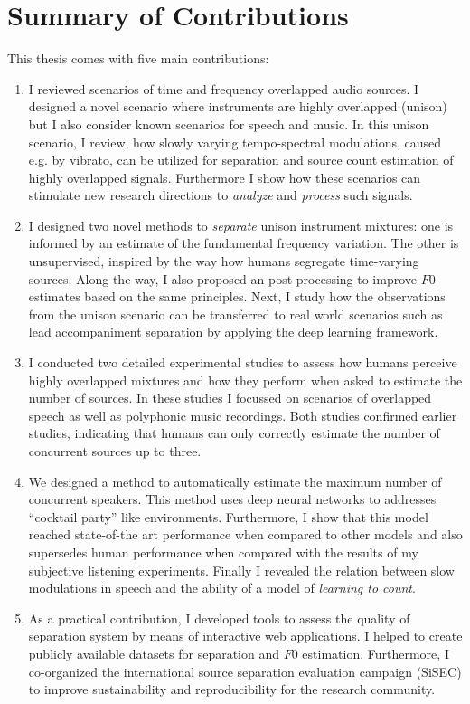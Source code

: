\section{Summary of Contributions}

This thesis comes with five main contributions:

\begin{enumerate}
\item I reviewed scenarios of time and frequency overlapped audio sources.
I designed a novel scenario where instruments are highly overlapped (unison) but I also consider known scenarios for speech and music.
In this unison scenario, I review, how slowly varying tempo-spectral modulations, caused e.g. by vibrato, can be utilized for separation and source count estimation of highly overlapped signals.
Furthermore I show how these scenarios can stimulate new research directions to \emph{analyze} and \emph{process} such signals.

\item I designed two novel methods to \emph{separate} unison instrument mixtures: one is informed by an estimate of the fundamental frequency variation.
The other is unsupervised, inspired by the way how humans segregate time-varying sources.
Along the way, I also proposed an post-processing to improve \(F0\) estimates based on the same principles.
Next, I study how the observations from the unison scenario can be transferred to real world scenarios such as lead accompaniment separation by applying the deep learning framework.

\item I conducted two detailed experimental studies to assess how humans perceive highly overlapped mixtures and how they perform when asked to estimate the number of sources.
In these studies I focussed on scenarios of overlapped speech as well as polyphonic music recordings.
Both studies confirmed earlier studies, indicating that humans can only correctly estimate the number of concurrent sources up to three.

\item We designed a method to automatically estimate the maximum number of concurrent speakers. This method uses deep neural networks to addresses ``cocktail party'' like environments.
Furthermore, I show that this model reached state-of-the art performance when compared to other models and also supersedes human performance when compared with the results of my subjective listening experiments.
Finally I revealed the relation between slow modulations in speech and the ability of a model of \emph{learning to count}.

\item As a practical contribution, I developed tools to assess the quality of separation system by means of interactive web applications. 
I helped to create publicly available datasets for separation and \(F0\) estimation.
Furthermore, I  co-organized the international source separation evaluation campaign (SiSEC) to improve sustainability and reproducibility for the research community.
\end{enumerate}

